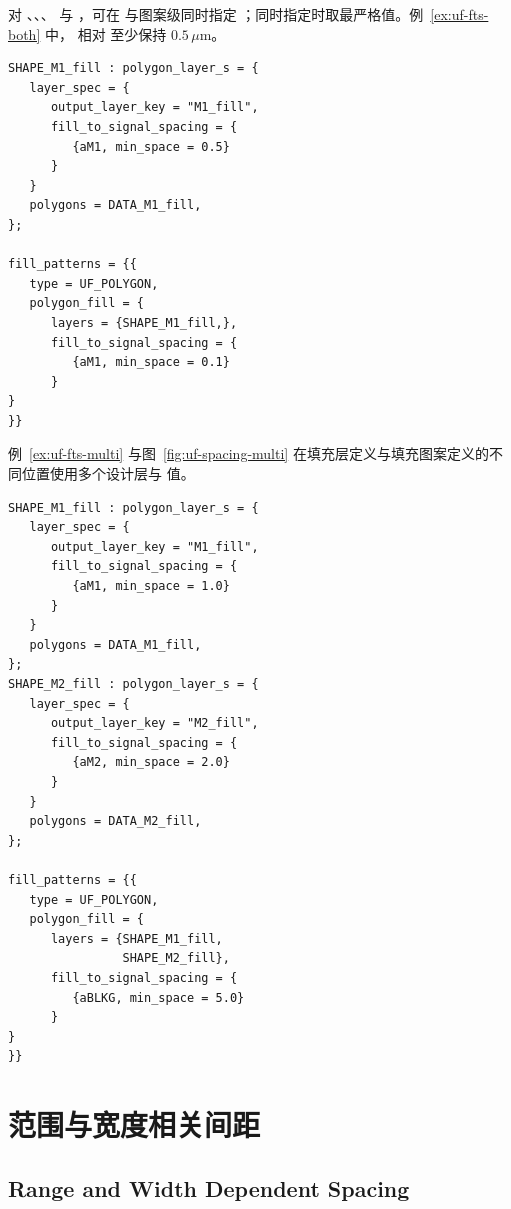 对 、、、 与 ，可在  与图案级同时指定 ；同时指定时取最严格值。例~\ref{ex:uf-fts-both} 中， 相对  至少保持 $0.5\,\mu\mathrm{m}$。

\begin{lstlisting}[style=pxl,caption={在 layer\_spec 与图案中同时定义 fill\_to\_signal\_spacing},label={ex:uf-fts-both}]
SHAPE_M1_fill : polygon_layer_s = {
   layer_spec = {
      output_layer_key = "M1_fill",
      fill_to_signal_spacing = {
         {aM1, min_space = 0.5}
      }
   }
   polygons = DATA_M1_fill,
};

fill_patterns = {{
   type = UF_POLYGON,
   polygon_fill = {
      layers = {SHAPE_M1_fill,},
      fill_to_signal_spacing = {
         {aM1, min_space = 0.1}
      }
}
}}
\end{lstlisting}

例~\ref{ex:uf-fts-multi} 与图~\ref{fig:uf-spacing-multi} 在填充层定义与填充图案定义的不同位置使用多个设计层与  值。

\begin{lstlisting}[style=pxl,caption={带 spacing\_context 与多个设计层的 fill\_to\_signal\_spacing},label={ex:uf-fts-multi}]
SHAPE_M1_fill : polygon_layer_s = {
   layer_spec = {
      output_layer_key = "M1_fill",
      fill_to_signal_spacing = {
         {aM1, min_space = 1.0}
      }
   }
   polygons = DATA_M1_fill,
};
SHAPE_M2_fill : polygon_layer_s = {
   layer_spec = {
      output_layer_key = "M2_fill",
      fill_to_signal_spacing = {
         {aM2, min_space = 2.0}
      }
   }
   polygons = DATA_M2_fill,
};

fill_patterns = {{
   type = UF_POLYGON,
   polygon_fill = {
      layers = {SHAPE_M1_fill,
                SHAPE_M2_fill},
      fill_to_signal_spacing = {
         {aBLKG, min_space = 5.0}
      }
}
}}
\end{lstlisting}


\section{范围与宽度相关间距}
\subsection*{Range and Width Dependent Spacing}

